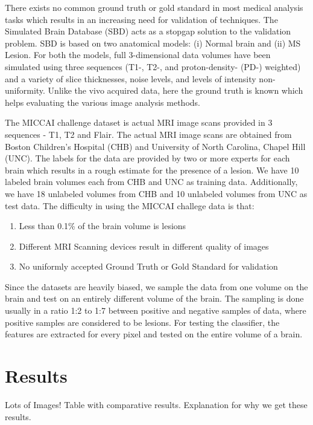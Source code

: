 \documentclass{article} %
\begin{document}
There exists no common ground truth or gold standard in most medical analysis tasks which results in an increasing need for validation of techniques. The Simulated Brain Database (SBD) acts as a stopgap solution to the validation problem. SBD is based on two anatomical models: (i) Normal brain and (ii) MS Lesion.  For both the models, full 3-dimensional data volumes have been simulated using three sequences (T1-, T2-, and proton-density- (PD-) weighted) and a variety of slice thicknesses, noise levels, and levels of intensity non-uniformity.  Unlike the vivo acquired data, here the ground truth is known which helps evaluating the various image analysis methods. 

The MICCAI challenge dataset is actual MRI image scans provided in 3 sequences - T1, T2 and Flair. The actual MRI image scans are obtained from Boston Children's Hospital (CHB) and University of North Carolina, Chapel Hill (UNC). The labels for the data are provided by two or more experts for each brain which results in a rough estimate for the presence of a lesion. We have 10 labeled brain volumes each from CHB and UNC as training data. Additionally, we have 18 unlabeled volumes from CHB and 10 unlabeled volumes from UNC as test data. The difficulty in using the MICCAI challege data is that:
\begin{enumerate}
\item Less than 0.1\% of the brain volume is lesions
\item Different MRI Scanning devices result in different quality of images
\item No uniformly accepted Ground Truth or Gold Standard for validation
\end{enumerate}

Since the datasets are heavily biased, we sample the data from one volume on the brain and test on an entirely different volume of the brain. The sampling is done usually in a ratio 1:2 to 1:7 between positive and negative samples of data, where positive samples are considered to be lesions. For testing the classifier, the features are extracted for every pixel and tested on the entire volume of a brain.  

\section{Results}
Lots of Images! Table with comparative results. Explanation for why we get these results. 
\end{document}
